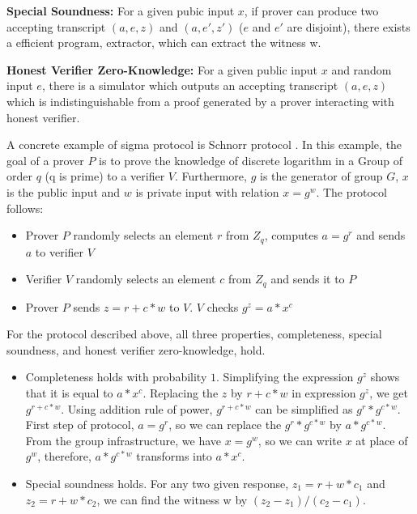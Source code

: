 {      \textbf{Special Soundness:} For a given pubic input $x$, if prover can produce two accepting transcript $(a, e, z)$ 
      and $(a, e', z')$ ($e$ and $e'$ are disjoint),  there exists a efficient program, extractor, which can extract the 
      witness w.
      
      \textbf{Honest Verifier Zero-Knowledge:} For a given public input $x$ and random input $e$, there is a simulator 
      which outputs an accepting transcript $(a, e, z)$ which is indistinguishable from a proof generated by 
      a prover interacting with honest verifier. 
     
     A concrete example of sigma protocol \citep{10.1007/3-540-48658-5_19} is Schnorr protocol \citep{10.1007/0-387-34805-0_22}.  In this example, 
     the goal of a prover $P$ is
     to prove the knowledge of discrete logarithm in a Group of order $q$ (q is prime) to a verifier $V$.
     Furthermore, $g$ is the generator of 
     group $G$, $x$ is the public input and $w$ is private input with relation $x = g^w$. The protocol follows:
     
     \begin{itemize}
     \item Prover $P$ randomly selects an element $r$ from $Z_{q}$, computes $a = g^r$ and sends $a$ to verifier $V$
     \item Verifier $V$ randomly selects an element $c$ from  $Z_{q}$ and sends it to $P$
     \item Prover $P$ sends $z = r + c * w $ to $V$.  $V$ checks $g^{z} = a * x^{c}$
     \end{itemize}
     
     For the protocol described above, all three properties, completeness, special soundness, and honest 
     verifier zero-knowledge, hold. 
     \begin{itemize}
      \item Completeness holds with probability $1$. Simplifying the expression $g^{z}$ shows that 
      it is equal to $a * x^{c}$. Replacing the $z$ by $r + c * w$ in expression  $g^{z}$, we get 
      $g^{r + c * w}$.  Using addition rule of power, $g^{r + c * w}$ can be simplified as 
      $g^{r} * g^{c * w}$. First step of protocol, $a = g^r$, so we can replace the $g^{r} * g^{c * w}$ 
      by $a * g^{c * w}$. From the group infrastructure, we have $x = g^w$, so we can write $x$ at place of 
      $g^{w}$, therefore, $a * g^{c * w}$ transforms into $a * x^c$. 
      
     \item Special soundness holds. For any two given response, 
     $z_{1} = r + w * c_{1}$ and  $z_{2} = r + w * c_{2}$, we can find the witness w by  $(z_{2} - z_{1})/(c_{2} - c_{1})$.
     

\end{itemize}}
